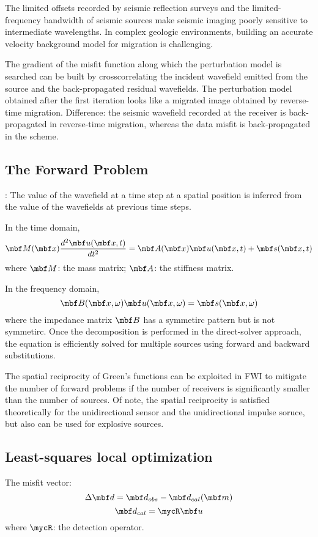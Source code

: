 The limited offsets recorded by seismic reflection surveys and
the limited-frequency bandwidth of seismic sources make seismic imaging
poorly sensitive to intermediate wavelengths.
In complex geologic environments, building an accurate velocity
background model for migration is challenging.

The gradient of the misfit function
along which the perturbation model is searched
can be built by crosscorrelating the incident wavefield
emitted from the source and
the back-propagated residual wavefields.
The perturbation model obtained after the first iteration
looks like a migrated image obtained by reverse-time migration.
Difference: the seismic wavefield recorded at the receiver
is back-propagated in reverse-time migration,
whereas the data misfit is back-propagated in the scheme.

\subsection{The Forward Problem}
: The value of the wavefield at a time step
at a spatial position is inferred from the value of the wavefields
at previous time steps.

In the time domain,
\[ \mbf M(\mbf x)\frac{d^2\mbf u(\mbf x,t)}{dt^2}=
\mbf A(\mbf x)\mbf u(\mbf x,t)+\mbf s(\mbf x,t) \]
where $\mbf M$: the mass matrix; $\mbf A$: the stiffness matrix.

In the frequency domain,
\[ \mbf B(\mbf x,\omega)\mbf u(\mbf x,\omega)=\mbf s(\mbf x,\omega) \]
where the impedance matrix $\mbf B$ has a symmetirc pattern
but is not symmetirc.
Once the decomposition is performed in the direct-solver approach,
the equation is efficiently solved for multiple sources
using forward and backward substitutions.

The spatial reciprocity of Green's functions can be exploited in FWI
to mitigate the number of forward problems if the number of receivers
is significantly smaller than the number of sources.
Of note, the spatial reciprocity is satisfied theoretically for
the unidirectional sensor and the unidirectional impulse soruce,
but also can be used for explosive sources.

\subsection{Least-squares local optimization}
The misfit vector:
\[ \Delta\mbf d=\mbf d_{obs}-\mbf d_{cal}(\mbf m) \]
\[ \mbf d_{cal}=\mycR\mbf u \]
where $\mycR$: the detection operator.

